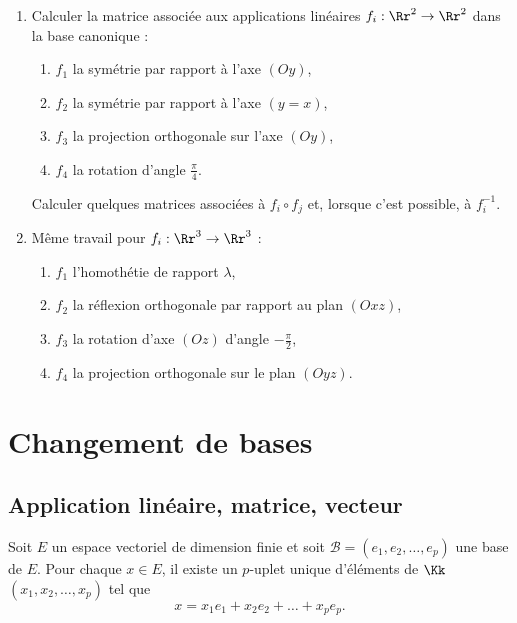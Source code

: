 \documentclass[class=report,crop=false]{standalone}
\begin{document}
\begin{miniexercices}
\sauteligne
\begin{enumerate}
  \item Calculer la matrice associée aux applications linéaires
  $f_i : \Rr^2 \to \Rr^2$ dans la base canonique :
  \begin{enumerate}
  \item $f_1$ la symétrie par rapport à l'axe $(Oy)$,
  \item $f_2$ la symétrie par rapport à l'axe $(y=x)$,
  \item $f_3$ la projection orthogonale sur l'axe $(Oy)$,
  \item $f_4$ la rotation d'angle $\frac\pi4$.
  \end{enumerate}
  Calculer quelques matrices associées à $f_i \circ f_j$ et,
  lorsque c'est possible, à $f_i^{-1}$.

  \item Même travail pour $f_i : \Rr^3 \to \Rr^3$ :
  \begin{enumerate}
  \item $f_1$ l'homothétie de rapport $\lambda$,
  \item $f_2$ la réflexion orthogonale par rapport au plan $(Oxz)$,
  \item $f_3$ la rotation d'axe $(Oz)$ d'angle $-\frac{\pi}{2}$,
  \item $f_4$ la projection orthogonale sur le plan $(Oyz)$.
  \end{enumerate}
\end{enumerate}
\end{miniexercices}


\section{Changement de bases}


\subsection{Application linéaire, matrice, vecteur}


Soit $E$ un espace vectoriel de dimension finie et
soit $\mathcal{B} = (e_1,e_2, \dots ,e_p )$ une base de $E$.
Pour chaque $x \in E$, il existe un $p$-uplet unique d'éléments de $\Kk$
$(x_1, x_2, \dots ,x_p)$ tel que
$$x=x_1e_1+x_2e_2+\dots +x_p e_p.$$
\end{document}
